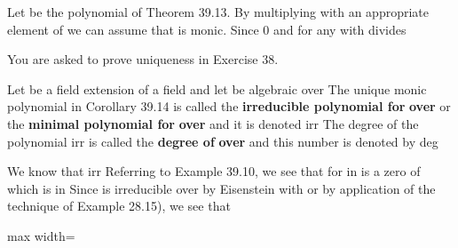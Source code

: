 \documentclass[11pt,oneside]{article}
\begin{document}
\begin{BookBody}
 Let  be the polynomial of Theorem 39.13. By multiplying  with an appropriate element of  we can assume that  is monic. Since  0 and for any  with  divides 

\end{BookBody}

\BookNarrativetrue

\begin{BookBody}

You are asked to prove uniqueness in Exercise 38. \BookEnd{\blacklozenge}

 Let  be a field extension of a field  and let  be algebraic over  The unique monic polynomial  in Corollary 39.14 is called the\textbf{ irreducible polynomial for} \BookInline{\alpha } \textbf{over}  or the\textbf{ minimal polynomial for} \BookInline{\alpha } \textbf{over}  and it is denoted irr The degree of the polynomial irr is called the\textbf{ degree of} \BookInline{\alpha } \textbf{over}  and this number is denoted by deg\BookEnd{\blacksquare}

 We know that irr Referring to Example 39.10, we see that for \BookInline{\alpha = }  in  is a zero of  which is in  Since  is irreducible over by Eisenstein with  or by application of the technique of Example 28.15), we see that

\begin{center}\begin{adjustbox}{max width=\linewidth}\end{adjustbox}\end{center}


\end{BookBody}
\end{document}
